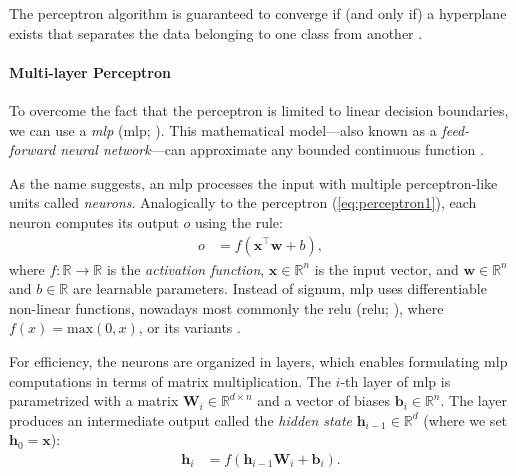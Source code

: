 The perceptron algorithm is guaranteed to converge if (and only if) a hyperplane exists that separates the data belonging to one class from another \cite{novikoff1962convergence}.

\paragraph{Multi-layer Perceptron} To overcome the fact that the perceptron is limited to linear decision boundaries, we can use a \emph{\acl{mlp}} (\acs{mlp}; \citealp[p.~164]{goodfellow2016deep}). This mathematical model---also known as a \emph{feed-forward neural network}---can approximate any bounded continuous function \cite{hornik1989multilayer}.

As the name suggests, an \ac{mlp} processes the input with multiple perceptron-like units called \textit{neurons}. Analogically to the perceptron (\autoref{eq:perceptron1}), each neuron computes its output $o$ using the rule:
\begin{align}
    o & = f(\mathbf{x}^\top \mathbf{w}  + b),
\end{align}
where $f: \mathbb{R} \rightarrow \mathbb{R}$ is the \emph{activation function}, $\mathbf{x}\in \mathbb{R}^n$ is the input vector, and $\mathbf{w} \in \mathbb{R}^n$ and $b \in \mathbb{R}$ are learnable parameters. Instead of signum, \ac{mlp} uses differentiable non-linear functions, nowadays most commonly the \acl{relu} (\acs{relu}; \citealp{nair2010rectified}), where $f(x) = \text{max}(0, x)$, or its variants \cite{hendrycks2016gaussian,dubey2022activation}.

For efficiency, the neurons are organized in layers, which enables formulating \ac{mlp} computations in terms of matrix multiplication. The $i$-th layer of \ac{mlp} is parametrized with a matrix $\mathbf{W}_i \in \mathbb{R}^{d\times n}$ and a vector of biases $\mathbf{b}_i \in \mathbb{R}^{n}$. The layer produces an intermediate output called the \textit{hidden state} $\mathbf{h}_{i-1} \in \mathbb{R}^{d}$ (where we set $\textbf{h}_0 = \textbf{x}$):
\begin{align}
    \mathbf{h}_i & = f(\mathbf{h}_{i-1} \mathbf{W}_i + \mathbf{b}_i).
\end{align}

